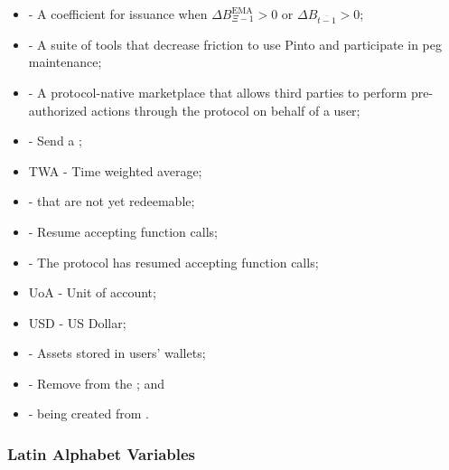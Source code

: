 \documentclass[class=article, crop=false]{standalone}
\begin{document}
\begin{itemize}[topsep=0pt, itemsep=3pt,leftmargin=16pt]
    \item[]  - A coefficient for  issuance when $\Delta B_{\Xi-1}^{\text{EMA}} > 0$ or $\Delta B_{\overline{t-1}} > 0$;
    \item[]  - A suite of tools that decrease friction to use Pinto and participate in peg maintenance;
    \item[]  - A protocol-native marketplace that allows third parties to perform pre-authorized actions through the protocol on behalf of a user;
    \item[]  - Send a ;
    \item[] TWA - Time weighted average;
    \item[]  -  that are not yet redeemable;
    \item[]  - Resume accepting  function calls;
    \item[]  - The protocol has resumed accepting  function calls;
    \item[] UoA - Unit of account;
    \item[] USD - US Dollar;
    \item[]  - Assets stored in users' wallets;
    \item[]  - Remove from the ; and
    \item[]  -  being created from  \Pinto.
\end{itemize}


\subsubsection{Latin Alphabet Variables}
\end{document}
